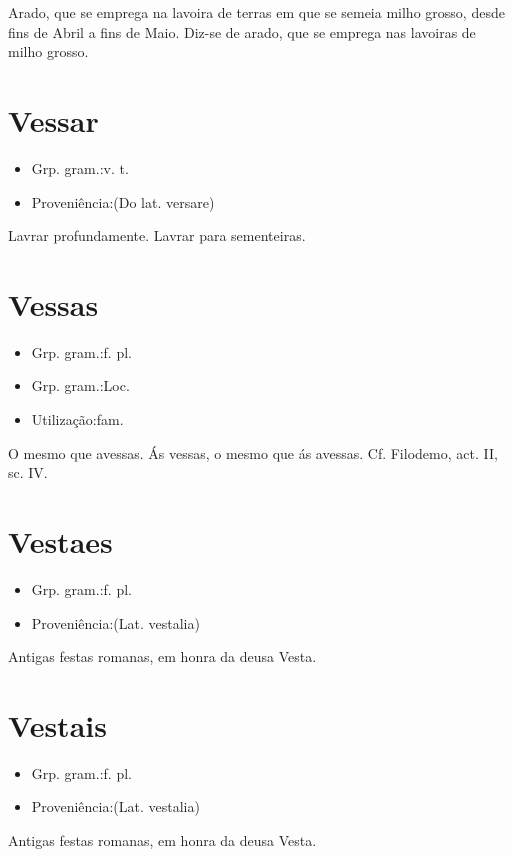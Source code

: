 \documentclass{article}
\begin{document}
Arado, que se emprega na lavoira de terras em que se semeia milho grosso, desde fins de Abril a fins de Maio.
Diz-se de arado, que se emprega nas lavoiras de milho grosso.
\section{Vessar}
\begin{itemize}
\item {Grp. gram.:v. t.}
\end{itemize}
\begin{itemize}
\item {Proveniência:(Do lat. \textunderscore versare\textunderscore )}
\end{itemize}
Lavrar profundamente.
Lavrar para sementeiras.
\section{Vessas}
\begin{itemize}
\item {Grp. gram.:f. pl.}
\end{itemize}
\begin{itemize}
\item {Grp. gram.:Loc.}
\end{itemize}
\begin{itemize}
\item {Utilização:fam.}
\end{itemize}
O mesmo que \textunderscore avessas\textunderscore .
\textunderscore Ás vessas\textunderscore , o mesmo que \textunderscore ás avessas\textunderscore . Cf. \textunderscore Filodemo\textunderscore , act. II, sc. IV.
\section{Vestaes}
\begin{itemize}
\item {Grp. gram.:f. pl.}
\end{itemize}
\begin{itemize}
\item {Proveniência:(Lat. \textunderscore vestalia\textunderscore )}
\end{itemize}
Antigas festas romanas, em honra da deusa Vesta.
\section{Vestais}
\begin{itemize}
\item {Grp. gram.:f. pl.}
\end{itemize}
\begin{itemize}
\item {Proveniência:(Lat. \textunderscore vestalia\textunderscore )}
\end{itemize}
Antigas festas romanas, em honra da deusa Vesta.
\end{document}
